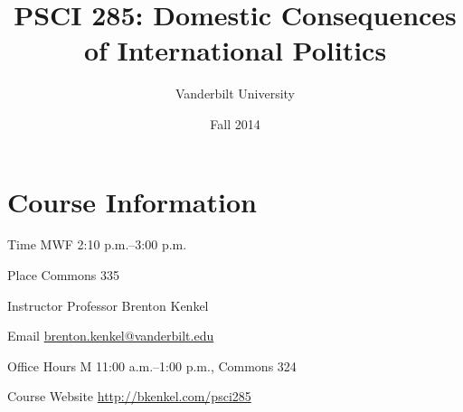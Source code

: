 \documentclass[nohyper]{tufte-handout}
\title{PSCI 285: Domestic Consequences of International Politics}
\author{Vanderbilt University}
\date{Fall 2014}
\begin{document}
\maketitle

\section{Course Information}

\begin{compactdesc}
  \item[Time] MWF 2:10 p.m.--3:00 p.m.
  \item[Place] Commons 335
  \item[Instructor] Professor Brenton Kenkel
  \begin{compactdesc}
    \item[Email] \href{mailto:brenton.kenkel@vanderbilt.edu}{brenton.kenkel@vanderbilt.edu}
    \item[Office Hours] M 11:00 a.m.--1:00 p.m., Commons 324
  \end{compactdesc}
  \item[Course Website] \url{http://bkenkel.com/psci285}
\end{compactdesc}


\end{document}
